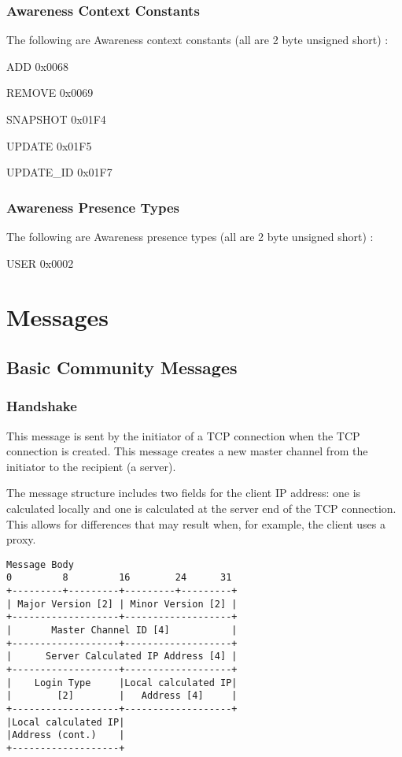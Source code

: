 \documentclass[titlepage,oneside]{book}
\begin{document}
\subsubsection{Awareness Context Constants}

The following are Awareness context constants (all are 2 byte unsigned
short) :

ADD        0x0068

REMOVE     0x0069

SNAPSHOT   0x01F4

UPDATE     0x01F5

UPDATE\_ID  0x01F7

\subsubsection{Awareness Presence Types}

The following are Awareness presence types (all are 2 byte unsigned
short) :

USER       0x0002

\section{Messages}

\subsection{Basic Community Messages}

\subsubsection{Handshake}

\par{} This message is sent by the initiator of a TCP connection when the TCP
connection is created. This message creates a new master channel from
the initiator to the recipient (a server).

\par{} The message structure includes two fields for the client IP address:
one is calculated locally and one is calculated at the server end of
the TCP connection. This allows for differences that may result when,
for example, the client uses a proxy.

\begin{verbatim}
Message Body
0         8         16        24      31
+---------+---------+---------+---------+
| Major Version [2] | Minor Version [2] |
+-------------------+-------------------+
|       Master Channel ID [4]           |
+-------------------+-------------------+
|      Server Calculated IP Address [4] |
+-------------------+-------------------+
|    Login Type     |Local calculated IP|
|        [2]        |   Address [4]     |
+-------------------+-------------------+
|Local calculated IP|
|Address (cont.)    |
+-------------------+
\end{verbatim}
\end{document}
